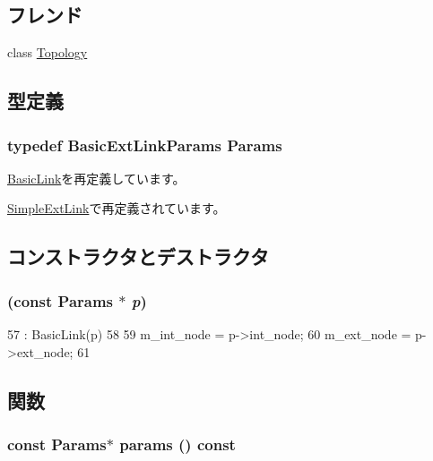 \subsection*{フレンド}
\begin{DoxyCompactItemize}
\item 
class \hyperlink{classBasicExtLink_acd2b8699ab7559c0da687cd775e2c778}{Topology}
\end{DoxyCompactItemize}


\subsection{型定義}
\hypertarget{classBasicExtLink_a124f6e2dedf13bd42661a62b7e155cee}{
\subsubsection[{Params}]{\setlength{\rightskip}{0pt plus 5cm}typedef BasicExtLinkParams {\bf Params}}}
\label{classBasicExtLink_a124f6e2dedf13bd42661a62b7e155cee}


\hyperlink{classBasicLink_a2c371814143f1675a601e935bfbd756c}{BasicLink}を再定義しています。

\hyperlink{classSimpleExtLink_a0653c80078cb239e9c7e87cfaead7ec9}{SimpleExtLink}で再定義されています。

\subsection{コンストラクタとデストラクタ}
\hypertarget{classBasicExtLink_a57eaee7926e07a173bdf9c2ff6fdc1f3}{
\subsubsection[{BasicExtLink}]{ (const {\bf Params} $\ast$ {\em p})}}
\label{classBasicExtLink_a57eaee7926e07a173bdf9c2ff6fdc1f3}



\begin{DoxyCode}
57     : BasicLink(p)
58 {
59     m_int_node = p->int_node;
60     m_ext_node = p->ext_node;
61 }
\end{DoxyCode}


\subsection{関数}
\hypertarget{classBasicExtLink_acd3c3feb78ae7a8f88fe0f110a718dff}{
\subsubsection[{params}]{\setlength{\rightskip}{0pt plus 5cm}const {\bf Params}$\ast$ params () const}}
\label{classBasicExtLink_acd3c3feb78ae7a8f88fe0f110a718dff}


